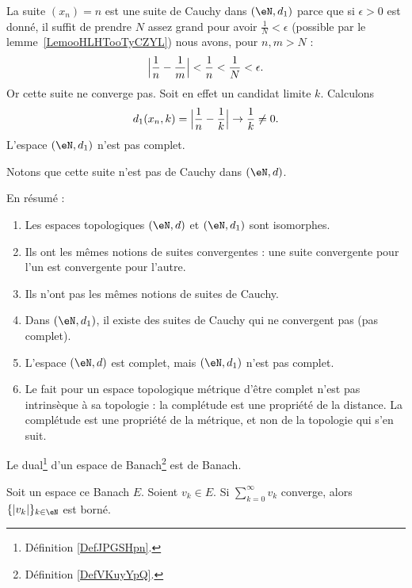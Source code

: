 \begin{example}
	La suite \( (x_n)=n\) est une suite de Cauchy dans \( (\eN,d_1)\) parce que si \( \epsilon>0\) est donné, il suffit de prendre \( N\) assez grand pour avoir \( \frac{1}{ N }<\epsilon\) (possible par le lemme~\ref{LemooHLHTooTyCZYL}) nous avons, pour \( n,m>N\) :
	\begin{equation}
		\Bigl| \frac{1}{ n }-\frac{1}{ m } \Bigr|<\frac{1}{ n }<\frac{1}{ N }<\epsilon.
	\end{equation}
	Or cette suite ne converge pas. Soit en effet un candidat limite \( k\). Calculons
	\begin{equation}
		d_1(x_n,k)= \Bigl| \frac{1}{ n }-\frac{1}{ k } \Bigr |\to \frac{1}{ k }\neq 0.
	\end{equation}
	L'espace \( (\eN,d_1)\) n'est pas complet.

	Notons que cette suite n'est pas de Cauchy dans \( (\eN,d)\).

	En résumé :
	\begin{enumerate}
		\item
		      Les espaces topologiques \( (\eN,d)\) et \( (\eN,d_1)\) sont isomorphes.
		\item
		      Ils ont les mêmes notions de suites convergentes : une suite convergente pour l'un est convergente pour l'autre.
		\item
		      Ils n'ont pas les mêmes notions de suites de Cauchy.
		\item
		      Dans \(  (\eN,d_1)  \), il existe des suites de Cauchy qui ne convergent pas (pas complet).
		\item
		      L'espace \( (\eN,d)\) est complet, mais \( (\eN,d_1)\) n'est pas complet.
		\item
		      Le fait pour un espace topologique métrique d'être complet n'est pas intrinsèque à sa topologie : la complétude est une propriété de la distance. La complétude est une propriété de la métrique, et non de la topologie qui s'en suit.
	\end{enumerate}
\end{example}


\begin{proposition}     \label{PROPooOVGGooNffWJW}
	Le dual\footnote{Définition \ref{DefJPGSHpn}.} d'un espace de Banach\footnote{Définition \ref{DefVKuyYpQ}.} est de Banach.
\end{proposition}

\begin{proposition}	\label{PROPooAPVCooFyMigL}
	Soit un espace ce Banach \( E\). Soient \( v_k\in E\). Si \( \sum_{k=0}^{\infty}v_k\) converge, alors \( \{ | v_k | \}_{k\in \eN} \) est borné.
\end{proposition}

